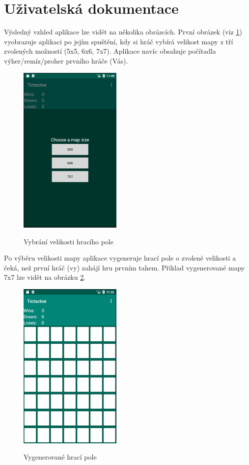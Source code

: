 \documentclass[12pt, a4paper]{article}
\begin{document}
\section{Uživatelská dokumentace}
Výsledný vzhled aplikace lze vidět na několika obrázcích. První obrázek (viz \ref{fig:title}) vyobrazuje aplikaci po jejím spuštění, kdy si hráč vybírá velikost mapy z tří zvolených možností (5x5, 6x6, 7x7). Aplikace navíc obsahuje počítadla výher/remíz/proher prvního hráče (Vás).
	\begin{figure}[h!]
	\centering
	\includegraphics[width=5cm]{img/title}\\
	\caption{Vybrání velikosti hracího pole}
	\label{fig:title}
	\end{figure}
\par
Po výběru velikosti mapy aplikace vygeneruje hrací pole o zvolené velikosti a čeká, než první hráč (vy) zahájí hru prvním tahem. Příklad vygenerované mapy 7x7 lze vidět na obrázku \ref{fig:board}.
\newpage
	\begin{figure}[h!]
	\centering
	\includegraphics[width=5cm]{img/board}\\
	\caption{Vygenerované hrací pole}
	\label{fig:board}
	\end{figure}
\end{document}
